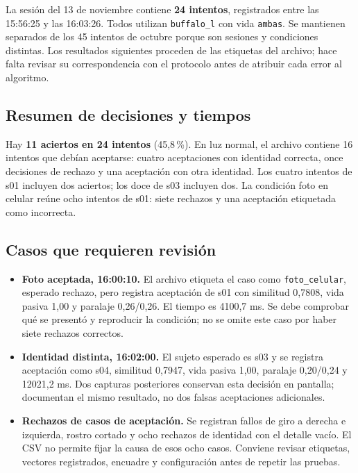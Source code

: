 La sesión del 13 de noviembre contiene \textbf{24 intentos}, registrados entre las 15:56:25 y las 16:03:26. Todos utilizan \texttt{buffalo\_l} con vida \texttt{ambas}. Se mantienen separados de los 45 intentos de octubre porque son sesiones y condiciones distintas. Los resultados siguientes proceden de las etiquetas del archivo; hace falta revisar su correspondencia con el protocolo antes de atribuir cada error al algoritmo.

\subsection{Resumen de decisiones y tiempos}
\begin{center}\small\singlespacing

\end{center}

Hay \textbf{11 aciertos en 24 intentos} (45,8\,\%). En luz normal, el archivo contiene 16 intentos que debían aceptarse: cuatro aceptaciones con identidad correcta, once decisiones de rechazo y una aceptación con otra identidad. Los cuatro intentos de s01 incluyen dos aciertos; los doce de s03 incluyen dos. La condición foto en celular reúne ocho intentos de s01: siete rechazos y una aceptación etiquetada como incorrecta.

\subsection{Casos que requieren revisión}
\begin{itemize}
\item \textbf{Foto aceptada, 16:00:10.} El archivo etiqueta el caso como \texttt{foto\_celular}, esperado rechazo, pero registra aceptación de s01 con similitud 0,7808, vida pasiva 1,00 y paralaje 0,26/0,26. El tiempo es 4100,7 ms. Se debe comprobar qué se presentó y reproducir la condición; no se omite este caso por haber siete rechazos correctos.
\item \textbf{Identidad distinta, 16:02:00.} El sujeto esperado es s03 y se registra aceptación como s04, similitud 0,7947, vida pasiva 1,00, paralaje 0,20/0,24 y 12021,2 ms. Dos capturas posteriores conservan esta decisión en pantalla; documentan el mismo resultado, no dos falsas aceptaciones adicionales.
\item \textbf{Rechazos de casos de aceptación.} Se registran fallos de giro a derecha e izquierda, rostro cortado y ocho rechazos de identidad con el detalle vacío. El CSV no permite fijar la causa de esos ocho casos. Conviene revisar etiquetas, vectores registrados, encuadre y configuración antes de repetir las pruebas.
\end{itemize}


